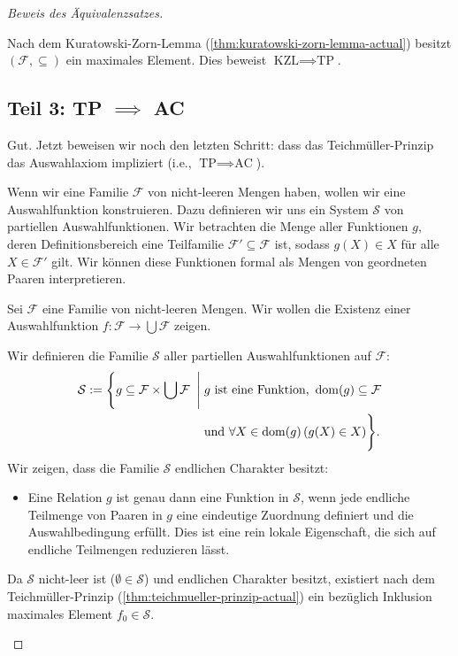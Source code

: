 \begin{proof}[Beweis des Äquivalenzsatzes]
\begin{math-stroke}
\begin{short-proof}
Nach dem Kuratowski-Zorn-Lemma (\cref{thm:kuratowski-zorn-lemma-actual}) besitzt $(\mathcal{F}, \subseteq)$ ein maximales Element. Dies beweist $\text{KZL} \implies \text{TP}$.
\end{short-proof}
\end{math-stroke}

\subsection{Teil 3: TP \texorpdfstring{$\implies$}{implies} AC}
\begin{spoken-clean}[01:26:34 - 01:28:40]
Gut. Jetzt beweisen wir noch den letzten Schritt: dass das Teichmüller-Prinzip das Auswahlaxiom impliziert (i.e., $\text{TP} \implies \text{AC}$).

Wenn wir eine Familie $\mathcal{F}$ von nicht-leeren Mengen haben, wollen wir eine Auswahlfunktion konstruieren. Dazu definieren wir uns ein System $\mathcal{S}$ von partiellen Auswahlfunktionen. Wir betrachten die Menge aller Funktionen $g$, deren Definitionsbereich eine Teilfamilie $\mathcal{F}' \subseteq \mathcal{F}$ ist, sodass $g(X) \in X$ für alle $X \in \mathcal{F}'$ gilt. Wir können diese Funktionen formal als Mengen von geordneten Paaren interpretieren.
\end{spoken-clean}

\begin{math-stroke}
\begin{short-proof}
Sei $\mathcal{F}$ eine Familie von nicht-leeren Mengen. Wir wollen die Existenz einer Auswahlfunktion $f \colon \mathcal{F} \to \bigcup \mathcal{F}$ zeigen.

Wir definieren die Familie $\mathcal{S}$ aller partiellen Auswahlfunktionen auf $\mathcal{F}$:
\begin{equation}\label{eq:partielle-auswahlfunktionen-actual}
\begin{split}
\mathcal{S} := \Biggl\{ g \subseteq \mathcal{F} \times \bigcup \mathcal{F} \;\Biggm|\; & g \text{ ist eine Funktion, } \operatorname{dom}(g) \subseteq \mathcal{F} \\
& \text{und } \forall X \in \operatorname{dom}(g) \, (g(X) \in X) \Biggr\}.
\end{split}
\end{equation}
Wir zeigen, dass die Familie $\mathcal{S}$ endlichen Charakter besitzt:
\begin{itemize}
    \item Eine Relation $g$ ist genau dann eine Funktion in $\mathcal{S}$, wenn jede endliche Teilmenge von Paaren in $g$ eine eindeutige Zuordnung definiert und die Auswahlbedingung erfüllt. Dies ist eine rein lokale Eigenschaft, die sich auf endliche Teilmengen reduzieren lässt.
\end{itemize}
Da $\mathcal{S}$ nicht-leer ist ($\emptyset \in \mathcal{S}$) und endlichen Charakter besitzt, existiert nach dem Teichmüller-Prinzip (\cref{thm:teichmueller-prinzip-actual}) ein bezüglich Inklusion maximales Element $f_0 \in \mathcal{S}$.


\end{short-proof}
\end{math-stroke}
\end{proof}
